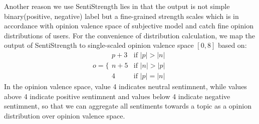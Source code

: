 \documentclass{acm_proc_article-sp}
\begin{document}
Another reason we use SentiStrength lies in that the output is not simple binary(positive, negative) label but a fine-grained strength scales which is in accordance with opinion valence space of subjective model and catch fine opinion distributions of users. 
For the convenience of distribution calculation, we map the output of SentiStrength to single-scaled opinion valence space $ \left[ 0, 8 \right] $ based on:
\begin{equation}
o= \lbrace 
\begin{array}{lll}
{p+3} & \text{if } \vert p \vert > \vert n \vert \\
{n+5} & \text{if } \vert n \vert > \vert p \vert \\
{4}  & \text{if } \vert p \vert = \vert n \vert
\end{array}
\end{equation}
In the opinion valence space, value 4 indicates neutral sentimnent, while values above 4 indicate positive sentimnent and values below 4 indicate negative sentimnent, so that we can aggregate all sentiments towards a topic as a opinion distribution over opinion valence space.
\end{document}

